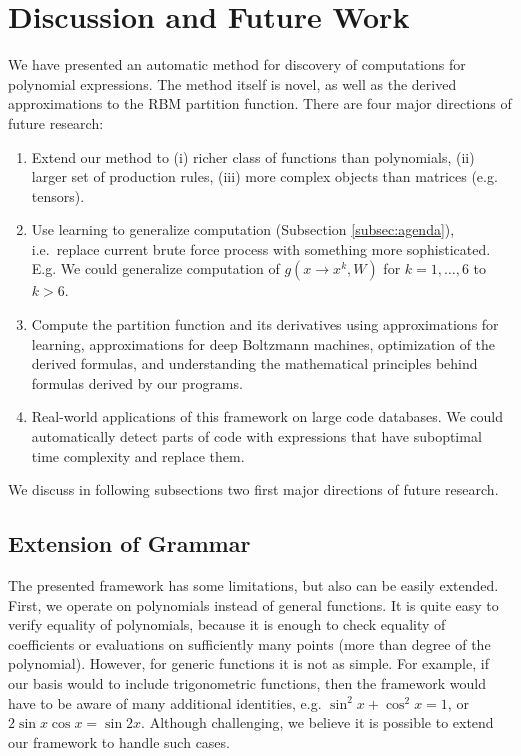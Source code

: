 \section{Discussion and Future Work}

We have presented an automatic method for discovery of computations for
 polynomial expressions. The method itself is novel, as well as the derived
approximations to the RBM partition function. There are four
major directions of future research: 

\begin{enumerate}
  \item Extend our method to (i) richer class of functions
    than polynomials, (ii) larger set of production rules, (iii) more complex
    objects than matrices (e.g. tensors).


  \item Use learning to generalize computation (Subsection \ref{subsec:agenda}), i.e.~replace 
    current brute force process with something more sophisticated. E.g. We could generalize computation of
$g(x \rightarrow x^k, W)$ for $k = 1, \dots, 6$ to $k > 6$. 


\item Compute the partition function and its derivatives using approximations for learning, 
  approximations for deep Boltzmann machines, optimization of the derived formulas, and understanding the
mathematical principles behind formulas derived by our programs. 

\item Real-world applications of this framework on large code databases. 
  We could automatically detect parts of code with expressions that have suboptimal 
  time complexity and replace them.
\end{enumerate}

We discuss in following subsections two first major directions of future research.


\subsection{Extension of Grammar}
The presented framework has some limitations, but also can be easily extended. First,
we operate on polynomials instead of general functions. It is quite easy to verify
equality of polynomials, because it is enough to check equality of coefficients or
evaluations on sufficiently many points (more than degree of
the polynomial). However, for generic functions
it is not as simple. For example, if our basis would to include trigonometric functions, then the
framework would have to be aware of many additional identities,
e.g. $\sin^2{x} + \cos^2{x} = 1$, or $2\sin x \cos x = \sin
2x$. Although challenging, we believe it is possible to extend our
framework to handle such cases. 

